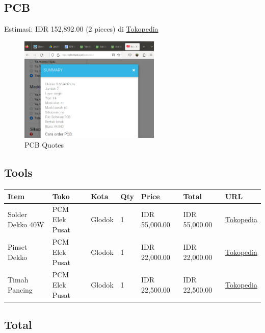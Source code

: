 \documentclass[a4paper,12pt,oneside,pdflatex,italian,final,twocolumn]{article}
\begin{document}
	\subsection{PCB}
	
	Estimasi: IDR 152,892.00 (2 pieces) di \href{https://www.tokopedia.com/raftech/jasa-cetak-pcb-general}{Tokopedia}
	
	\begin{figure}[h]
		\centering
		\includegraphics[width=0.6\textwidth]{images/pcb_quotes.png}
		\caption{PCB Quotes}
	\end{figure}
	
	\subsection{Tools}
	
	\begin{table}[!ht]
		\centering
		\begin{tabular}{|l|l|l|l|l|l|l|}
			\hline
			Item & Toko & Kota & Qty & Price & Total & URL \\ \hline
			Solder Dekko 40W & PCM Elek Pusat & Glodok & 1 & IDR 55,000.00 & IDR 55,000.00 & \href{https://www.tokopedia.com/pcmelektronik/soldering-solder-iron-dekko-deko-40w-40-watr}{Tokopedia} \\ \hline
			Pinset Dekko & PCM Elek Pusat & Glodok & 1 & IDR 22,000.00 & IDR 22,000.00 & \href{https://www.tokopedia.com/pcmelektronik/pinset-dekko-tekuk-bagus-ori}{Tokopedia} \\ \hline
			Timah Pancing & PCM Elek Pusat & Glodok & 1 & IDR 22,500.00 & IDR 22,500.00 & \href{https://www.tokopedia.com/pcmelektronik/timah-solder-1-rol-10-meter-merk-pancing}{Tokopedia} \\ \hline
		\end{tabular}
	\end{table}
	
	\subsection{Total}
	
\end{document}
